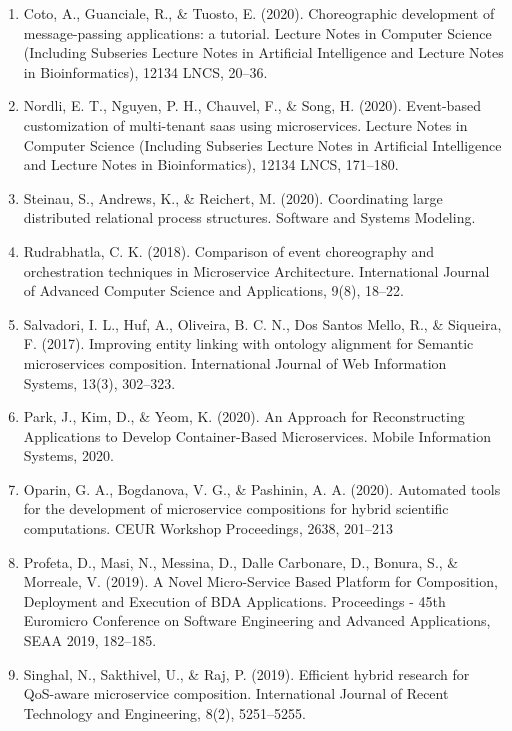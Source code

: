 \documentclass{article}
\begin{document}
\begin{enumerate}
\item Coto, A., Guanciale, R., \& Tuosto, E. (2020). Choreographic development of message-passing applications: a tutorial. Lecture Notes in Computer Science (Including Subseries Lecture Notes in Artificial Intelligence and Lecture Notes in Bioinformatics), 12134 LNCS, 20–36.

\item Nordli, E. T., Nguyen, P. H., Chauvel, F., \& Song, H. (2020). Event-based customization of multi-tenant saas using microservices. Lecture Notes in Computer Science (Including Subseries Lecture Notes in Artificial Intelligence and Lecture Notes in Bioinformatics), 12134 LNCS, 171–180.

\item Steinau, S., Andrews, K., \& Reichert, M. (2020). Coordinating large distributed relational process structures. Software and Systems Modeling.

\item Rudrabhatla, C. K. (2018). Comparison of event choreography and orchestration techniques in Microservice Architecture. International Journal of Advanced Computer Science and Applications, 9(8), 18–22.

\item Salvadori, I. L., Huf, A., Oliveira, B. C. N., Dos Santos Mello, R., \& Siqueira, F. (2017). Improving entity linking with ontology alignment for Semantic microservices composition. International Journal of Web Information Systems, 13(3), 302–323.

\item Park, J., Kim, D., \& Yeom, K. (2020). An Approach for Reconstructing Applications to Develop Container-Based Microservices. Mobile Information Systems, 2020.

\item Oparin, G. A., Bogdanova, V. G., \& Pashinin, A. A. (2020). Automated tools for the development of microservice compositions for hybrid scientific computations. CEUR Workshop Proceedings, 2638, 201–213

\item Profeta, D., Masi, N., Messina, D., Dalle Carbonare, D., Bonura, S., \& Morreale, V. (2019). A Novel Micro-Service Based Platform for Composition, Deployment and Execution of BDA Applications. Proceedings - 45th Euromicro Conference on Software Engineering and Advanced Applications, SEAA 2019, 182–185.

\item Singhal, N., Sakthivel, U., \& Raj, P. (2019). Efficient hybrid research for QoS-aware microservice composition. International Journal of Recent Technology and Engineering, 8(2), 5251–5255.


\end{enumerate}
\end{document}
